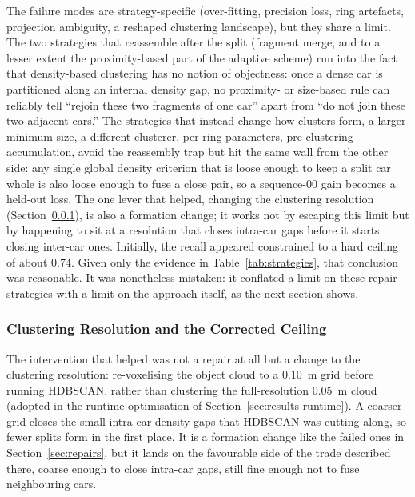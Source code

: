 The failure modes are strategy-specific (over-fitting, precision loss, ring
artefacts, projection ambiguity, a reshaped clustering landscape), but they share
a limit. The two strategies that reassemble after the split (fragment merge, and to
a lesser extent the proximity-based part of the adaptive scheme) run into the fact
that density-based clustering has no notion of objectness: once a dense car is
partitioned along an internal density gap, no proximity- or size-based rule can
reliably tell ``rejoin these two fragments of one car'' apart from ``do not join
these two adjacent cars.'' The strategies that instead change how clusters
form, a larger minimum size, a different clusterer, per-ring parameters,
pre-clustering accumulation, avoid the reassembly trap but hit the same wall from
the other side: any single global density criterion that is loose enough to keep a
split car whole is also loose enough to fuse a close pair, so a sequence-00 gain
becomes a held-out loss. The one lever that helped, changing the clustering
resolution (Section~\ref{sec:resolution-fix}), is also a formation change; it
works not by escaping this limit but by happening to sit at a resolution that closes
intra-car gaps before it starts closing inter-car ones. Initially, the recall appeared
constrained to a hard ceiling of about \num{0.74}. Given only the evidence in
Table~\ref{tab:strategies}, that conclusion was reasonable. It was nonetheless mistaken:
it conflated a limit on these repair strategies with a limit on the approach itself, as
the next section shows.

\subsubsection{Clustering Resolution and the Corrected Ceiling}
\label{sec:resolution-fix}

The intervention that helped was not a repair at all but a change to the clustering
resolution: re-voxelising the object cloud to a \SI{0.10}{\metre} grid
before running HDBSCAN, rather than clustering the full-resolution
\SI{0.05}{\metre} cloud (adopted in the runtime optimisation of
Section~\ref{sec:results-runtime}). A coarser grid closes the small intra-car density gaps that HDBSCAN was
cutting along, so fewer splits form in the first place. It is a formation change like
the failed ones in Section~\ref{sec:repairs}, but it lands on the favourable side of
the trade described there, coarse enough to close intra-car gaps, still fine
enough not to fuse neighbouring cars.

